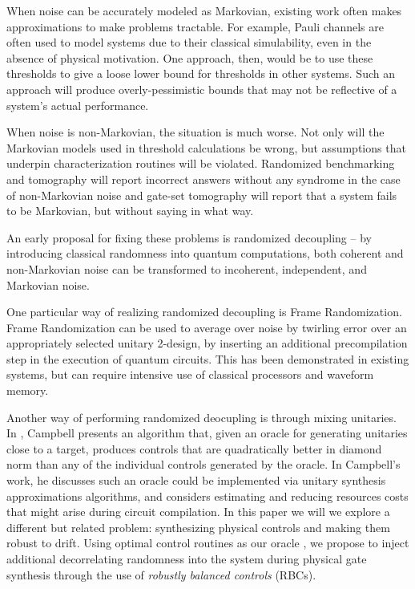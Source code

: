 \documentclass[aps,nofootinbib,pra,notitlepage,twocolumn]{revtex4-1}
\begin{document}
When noise can be accurately modeled as Markovian, existing work often makes approximations to make problems tractable. For example, Pauli channels are often used to model systems due to their classical simulability\cite{quant-ph/9807006}, even in the absence of physical motivation\cite{Aliferis2007, Knill2005, Wang2011, DuclosCianci2010, Wootton2012, Bombin2012, Puzzuoli2014, aliferis2008accuracy}. One approach, then, would be to use these thresholds to give a loose lower bound for thresholds in other systems\cite{Puzzuoli2014}. Such an approach will produce overly-pessimistic bounds that may not be reflective of a system's actual performance.

When noise is non-Markovian, the situation is much worse. Not only will the Markovian models used in threshold calculations be wrong, but assumptions that underpin characterization routines will be violated. Randomized benchmarking and tomography will report incorrect answers without any syndrome in the case of non-Markovian noise \cite{Merkel2013} and gate-set tomography will report that a system fails to be Markovian, but without saying in what way. 

An early proposal for fixing these problems is randomized decoupling\cite{Viola2005, Viola} -- by introducing classical randomness into quantum computations, both coherent and non-Markovian noise can be transformed to incoherent, independent, and Markovian noise. 

One particular way of realizing randomized decoupling is Frame Randomization\cite{Wallman2016, Ware2018}. Frame Randomization can be used to average over noise by twirling error over an appropriately selected unitary 2-design, by inserting an additional precompilation step in the execution of quantum circuits.\cite{roy2009unitary} This has been demonstrated in existing systems\cite{Ware2018}, but can require intensive use of classical processors and waveform memory.

Another way of performing randomized deocupling is through mixing unitaries. In \cite{Campbell2017}, Campbell presents an algorithm that, given an oracle for generating unitaries close to a target, produces controls that are quadratically better in diamond norm than any of the individual controls generated by the oracle. In Campbell's work, he discusses such an oracle could be implemented via unitary synthesis approximations algorithms\cite{1612.01011}, and considers estimating and reducing resources costs that might arise during circuit compilation. In this paper we will we explore a different but related problem: synthesizing physical controls and making them robust to drift. Using optimal control routines as our oracle , we propose to inject additional decorrelating randomness into the system during physical gate synthesis through the use of \emph{robustly balanced controls} (RBCs).
 
\end{document}
